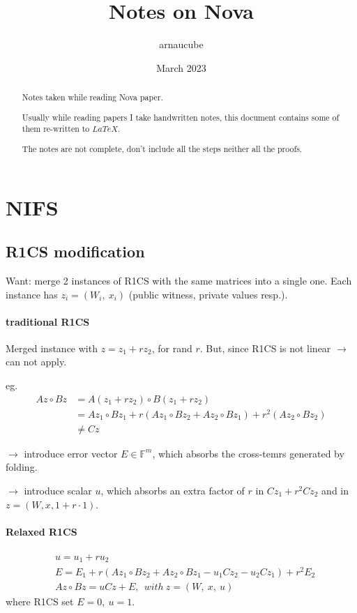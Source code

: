 \documentclass{article}
\title{Notes on Nova}
\author{arnaucube}
\date{March 2023}
\theoremstyle{definition}
\begin{document}
\maketitle

\begin{abstract}
	Notes taken while reading Nova \cite{cryptoeprint:2021/370} paper.

	Usually while reading papers I take handwritten notes, this document contains some of them re-written to $LaTeX$.

	The notes are not complete, don't include all the steps neither all the proofs.
\end{abstract}

\tableofcontents

\section{NIFS}

\subsection{R1CS modification}

Want: merge 2 instances of R1CS with the same matrices into a single one. Each instance has $z_i = (W_i,~ x_i)$ (public witness, private values resp.).

\paragraph{traditional R1CS}
Merged instance with $z=z_1 + r z_2$, for rand $r$. But, since R1CS is not linear $\longrightarrow$ can not apply.

eg.
\begin{align*}
	Az \circ Bz &= A(z_1 + r z_2) \circ B (z_1 + r z_2)\\
	&= A z_1 \circ B z_1 + r(A z_1 \circ B z_2 + A z_2 \circ B z_1) + r^2 (A z_2 \circ B z_2)\\
	&\neq Cz
\end{align*}

$\longrightarrow$ introduce error vector $E \in \mathbb{F}^m$, which absorbs the cross-temrs generated by folding.

$\longrightarrow$ introduce scalar $u$, which absorbs an extra factor of $r$ in $C z_1 + r^2 C z_2$ and in $z=(W, x, 1+r\cdot 1)$.

\paragraph{Relaxed R1CS}
\begin{align*}
	&u=u_1+r u_2\\
	&E=E_1 + r (A z_1 \circ B z_2 + A z_2 \circ B z_1 - u_1 C z_2 - u_2 C z_1) + r^2 E_2\\
	&Az \circ Bz = uCz + E,~~ with~ z=(W,~x,~u)
\end{align*}
where R1CS set $E=0,~u=1$.
\end{document}
